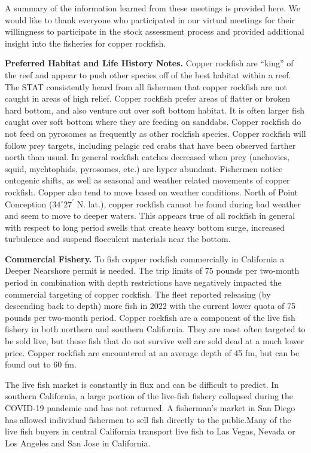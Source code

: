 \documentclass[11pt,
  letterpaper,
]{article}
\begin{document}
A summary of the information learned from these meetings is provided here. We would like to thank everyone who participated in our virtual meetings for their willingness to participate in the stock assessment process and provided additional insight into the fisheries for copper rockfish.

\textbf{Preferred Habitat and Life History Notes.} Copper rockfish are ``king'' of the reef and appear to push other species off of the best habitat within a reef. The STAT consistently heard from all fishermen that copper rockfish are not caught in areas of high relief. Copper rockfish prefer areas of flatter or broken hard bottom, and also venture out over soft bottom habitat. It is often larger fish caught over soft bottom where they are feeding on sanddabs. Copper rockfish do not feed on pyrosomes as frequently as other rockfish species. Copper rockfish will follow prey targets, including pelagic red crabs that have been observed farther north than usual. In general rockfish catches decreased when prey (anchovies, squid, mychtophids, pyrosomes, etc.) are hyper abundant. Fishermen notice ontogenic shifts, as well as seasonal and weather related movements of copper rockfish. Copper also tend to move based on weather conditions. North of Point Conception ($34^\circ 27^\prime$ N. lat.), copper rockfish cannot be found during bad weather and seem to move to deeper waters. This appears true of all rockfish in general with respect to long period swells that create heavy bottom surge, increased turbulence and suspend flocculent materials near the bottom.

\textbf{Commercial Fishery.} To fish copper rockfish commercially in California a Deeper Nearshore permit is needed. The trip limits of 75 pounds per two-month period in combination with depth restrictions have negatively impacted the commercial targeting of copper rockfish. The fleet reported releasing (by descending back to depth) more fish in 2022 with the current lower quota of 75 pounds per two-month period. Copper rockfish are a component of the live fish fishery in both northern and southern California. They are most often targeted to be sold live, but those fish that do not survive well are sold dead at a much lower price. Copper rockfish are encountered at an average depth of 45 fm, but can be found out to 60 fm.

The live fish market is constantly in flux and can be difficult to predict. In southern California, a large portion of the live-fish fishery collapsed during the COVID-19 pandemic and has not returned. A fisherman's market in San Diego has allowed individual fishermen to sell fish directly to the public.Many of the live fish buyers in central California transport live fish to Las Vegas, Nevada or Los Angeles and San Jose in California.
\end{document}
